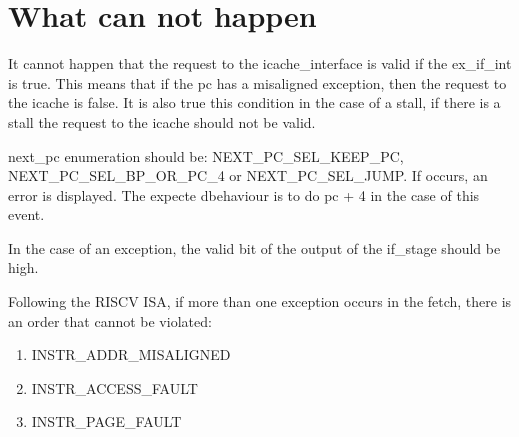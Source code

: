 \section{What can not happen}
It cannot happen that the request to the icache\_interface is valid if the ex\_if\_int is true. This means that if the pc has a misaligned exception, then the request to the icache is false. It is also true this condition in the case of a stall, if there is a stall the request to the icache should not be valid.

next\_pc enumeration should be: NEXT\_PC\_SEL\_KEEP\_PC, NEXT\_PC\_SEL\_BP\_OR\_PC\_4 or NEXT\_PC\_SEL\_JUMP. If occurs, an error is displayed. The expecte dbehaviour is to do pc + 4 in the case of this event.

In the case of an exception, the valid bit of the output of the if\_stage should be high.

Following the RISCV ISA, if more than one exception occurs in the fetch, there is an order that cannot be violated:

\begin{enumerate}
	\item INSTR\_ADDR\_MISALIGNED
    \item INSTR\_ACCESS\_FAULT
    \item INSTR\_PAGE\_FAULT
\end{enumerate}

 